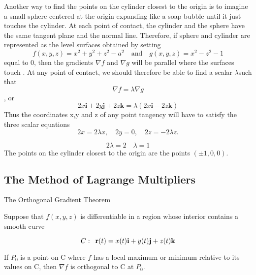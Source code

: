 \documentclass[12pt,a4paper]{article}
\newenvironment{ruleBox}[1]{\begin{rulebox}{#1}}{\end{rulebox}\vspace{1\baselineskip}}
\begin{document}
\begin{example}
\begin{solution}
        \end{solution}
        \begin{solution}
            Another way to find the points on the cylinder closest to the origin is to imagine a small sphere centered at the origin expanding like a soap bubble until it just touches the cylinder. At each point of contact, the cylinder and the sphere have the same tangent plane and the normal line. Therefore, if sphere and cylinder are represented as the level surfaces obtained by setting
            \[f(x,y,z) = x^2 + y^2 + z^2 -a^2 \quad \textrm{and} \quad g(x,y,z) = x^2 - z^2 -1\]
            equal to 0, then the gradients \(\nabla f\) and \(\nabla g\) will be parallel where the surfaces touch . At any point of contact, we should therefore be able to find a scalar \(\lambda\)such that
            \[\nabla f = \lambda \nabla g\],
            or
            \[2x\mathbf{i} + 2y\mathbf{j} + 2z\mathbf{k} = \lambda (2x\mathbf{i} -2z \mathbf{k} )\]
            Thus the coordinates x,y and z of any point tangency will have to satisfy the three scalar equations
            \[2x = 2\lambda x, \quad 2y = 0, \quad 2z = -2 \lambda z.\]

            \[2\lambda = 2 \quad \lambda =1\]
            The points on the cylinder closest to the origin are the points \((\pm 1, 0,0)\).



        \end{solution}

        
\end{example}


\subsection{The Method of Lagrange Multipliers}

\begin{ruleBox}{The Orthogonal Gradient Theorem}

    Suppose that \(f(x,y,z)\) is differentiable in a region whose interior contains a smooth curve

    \[C: \hspace*{0.5em} \mathbf{r}(t) = x(t)\mathbf{i} + y(t)\mathbf{j} + z(t)\mathbf{k}\]

    If \(P_0\) is a point on C where \(f\) has a local maximum or minimum relative to its values on C, then \(\nabla f\) is orthogonal to C at \(P_0\).
    
\end{ruleBox}
\end{document}
